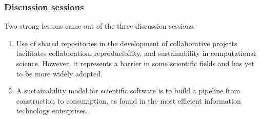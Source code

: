 \documentclass[11pt, oneside]{amsart}
\begin{document}

\subsubsection*{Discussion sessions}

Two strong lessons came out of the three discussion sessions:

\begin{enumerate}
\item Use of shared repositories in the development of collaborative
  projects facilitates collaboration, reproducibility, and
  sustainability in computational science. However, it represents a
  barrier in some scientific fields and has yet to be more widely
  adopted.




\item A sustainability model for scientific software is to build a
  pipeline from construction to consumption, as found in the most
  efficient information technology enterprises.

\end{enumerate}
\end{document}
